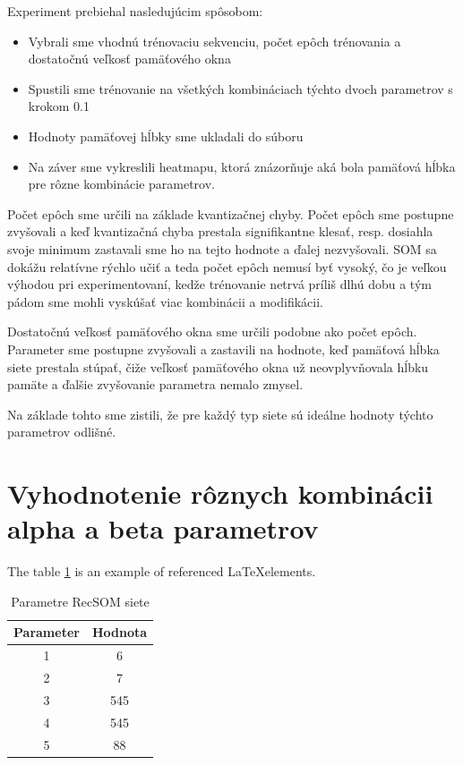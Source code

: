 Experiment prebiehal nasledujúcim spôsobom:
\begin{itemize}
    \item Vybrali sme vhodnú trénovaciu sekvenciu, počet epôch trénovania a dostatočnú veľkosť pamäťového okna
    \item Spustili sme trénovanie na všetkých kombináciach týchto dvoch parametrov s krokom 0.1
    \item Hodnoty pamäťovej hĺbky sme ukladali do súboru
    \item Na záver sme vykreslili heatmapu, ktorá znázorňuje aká bola pamäťová hĺbka pre rôzne kombinácie parametrov.
\end{itemize}


Počet epôch sme určili na základe kvantizačnej chyby.
Počet epôch sme postupne zvyšovali a keď kvantizačná chyba prestala signifikantne klesať, resp. dosiahla 
svoje minimum zastavali sme ho na tejto hodnote a ďalej nezvyšovali. SOM sa dokážu relatívne rýchlo učiť a 
teda počet epôch nemusí byť vysoký, čo je veľkou výhodou pri experimentovaní, kedže trénovanie netrvá príliš dlhú dobu
a tým pádom sme mohli vyskúšať viac kombinácii a modifikácii.

Dostatočnú veľkosť pamäťového okna sme určili podobne ako počet epôch. Parameter sme postupne zvyšovali
a zastavili na hodnote, keď pamäťová hĺbka siete prestala stúpať, čiže veľkosť pamäťového okna už
neovplyvňovala hĺbku pamäte a ďalšie zvyšovanie parametra nemalo zmysel. 

Na základe tohto sme zistili, že pre každý typ siete sú ideálne hodnoty týchto parametrov odlišné.


\section{Vyhodnotenie rôznych kombinácii alpha a beta parametrov}

The table \ref{table:1} is an example of referenced \LaTeX elements.
 
\begin{table}[h!]
\centering
\begin{tabular}{|c|c|} 
 \hline
 Parameter & Hodnota \\ 
 \hline\hline
 1 & 6  \\ 
 \hline
 2 & 7   \\
 \hline
 3 & 545  \\
 \hline
 4 & 545  \\
 \hline
 5 & 88 \\  
 \hline
\end{tabular}
\caption{Parametre RecSOM siete}
\label{table:1}
\end{table}


